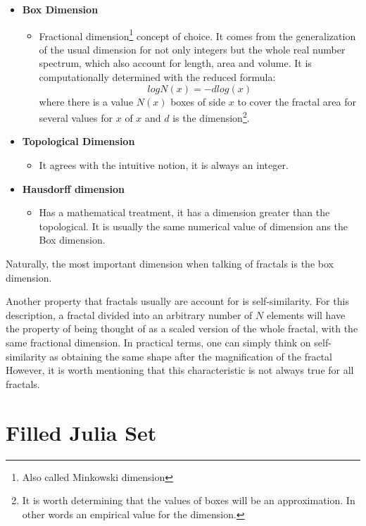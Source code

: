 \documentclass{article}
\begin{document}
\begin{itemize}
    \item \textbf{Box Dimension}
    \begin{itemize}
        \item Fractional dimension\footnote{Also called Minkowski dimension} concept of choice. It comes from the generalization of the usual dimension for not only integers but the whole real number spectrum, which also account for length, area and volume. It is computationally determined with the reduced formula:
        \begin{equation}
            log N(x)=- dlog(x)
        \end{equation}
         where there is a value $N(x)$ boxes of side $x$ to cover the fractal area for several values for $x$ of $x$ and $d$ is the dimension\footnote{It is worth determining that the values of boxes will be an approximation. In other words an empirical value for the dimension.}.
    \end{itemize}
   
    \item \textbf{Topological Dimension}
    \begin{itemize}
        \item It agrees with the intuitive notion, it is always an integer. 
    \end{itemize}
    \item \textbf{Hausdorff dimension}
    \begin{itemize}
        \item Has a mathematical treatment, it has a dimension greater than the topological. It is usually the same numerical value of dimension ans the Box dimension.
    \end{itemize}
\end{itemize}

Naturally, the most important dimension when talking of fractals is the box dimension.

Another property that fractals usually are account for is self-similarity. For this description, a fractal divided into an arbitrary number of $N$ elements will have the property of being thought of as a scaled version of the whole fractal, with the same fractional dimension\cite{Crownover}. In practical terms, one can simply think on self-similarity as obtaining the same shape after the magnification of the fractal However, it is worth mentioning that this characteristic is not always true for all fractals.

\section{Filled Julia Set}
\end{document}

